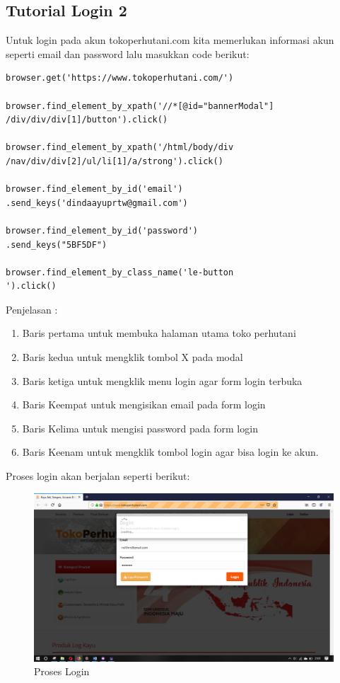 \newpage
\subsection{Tutorial Login 2}
Untuk login pada akun tokoperhutani.com kita memerlukan informasi akun seperti email dan password lalu masukkan code berikut:
\begin{verbatim}
browser.get('https://www.tokoperhutani.com/')

browser.find_element_by_xpath('//*[@id="bannerModal"]
/div/div/div[1]/button').click()

browser.find_element_by_xpath('/html/body/div
/nav/div/div[2]/ul/li[1]/a/strong').click()

browser.find_element_by_id('email')
.send_keys('dindaayuprtw@gmail.com')

browser.find_element_by_id('password')
.send_keys("5BF5DF")

browser.find_element_by_class_name('le-button
').click()
\end{verbatim}

Penjelasan :
\begin{enumerate}
	\item Baris pertama untuk membuka halaman utama toko perhutani
	\item Baris kedua untuk mengklik tombol X pada modal
	\item Baris ketiga untuk mengklik menu login agar form login terbuka
	\item Baris Keempat untuk mengisikan email pada form login 
	\item Baris Kelima untuk mengisi password pada form login
	\item Baris Keenam untuk mengklik tombol login agar bisa login ke akun.
\end{enumerate}

\newpage
Proses login akan berjalan seperti berikut:
\begin{figure}[h]
	\centering
	\includegraphics[scale=0.28]{figures/1login}
	\caption{Proses Login}
\end{figure}

